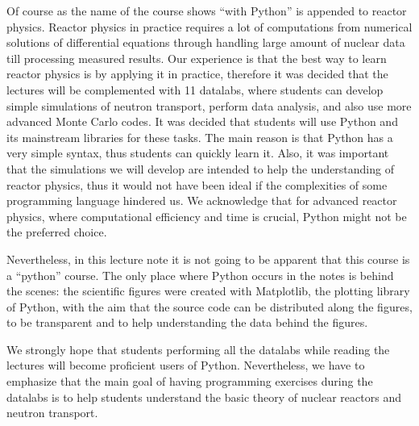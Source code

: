 Of course as the name of the course shows ``with Python'' is appended to reactor physics. Reactor physics in practice requires a lot of computations from numerical solutions of differential equations through handling large amount of nuclear data till processing measured results. Our experience is that the best way to learn reactor physics is by applying it in practice, therefore it was decided that the lectures will be complemented with 11 datalabs, where students can develop simple simulations of neutron transport, perform data analysis, and also use more advanced Monte Carlo codes. It was decided that students will use Python and its mainstream libraries for these tasks. The main reason is that Python has a very simple syntax, thus students can quickly learn it. Also, it was important that the simulations we will develop are intended to help the understanding of reactor physics, thus it would not have been ideal if the complexities of some programming language hindered us. We acknowledge that for advanced reactor physics, where computational efficiency and time is crucial, Python might not be the preferred choice.

Nevertheless, in this lecture note it is not going to be apparent that this course is a ``python'' course. The only place where Python occurs in the notes is behind the scenes: the scientific figures were created with Matplotlib, the plotting library of Python, with the aim that the source code can be distributed along the figures, to be transparent and to help understanding the data behind the figures. 

We strongly hope that students performing all the datalabs while reading the lectures will become proficient users of Python. Nevertheless, we have to emphasize that the main goal of having programming exercises during the datalabs is to help students understand the basic theory of nuclear reactors and neutron transport.

%
